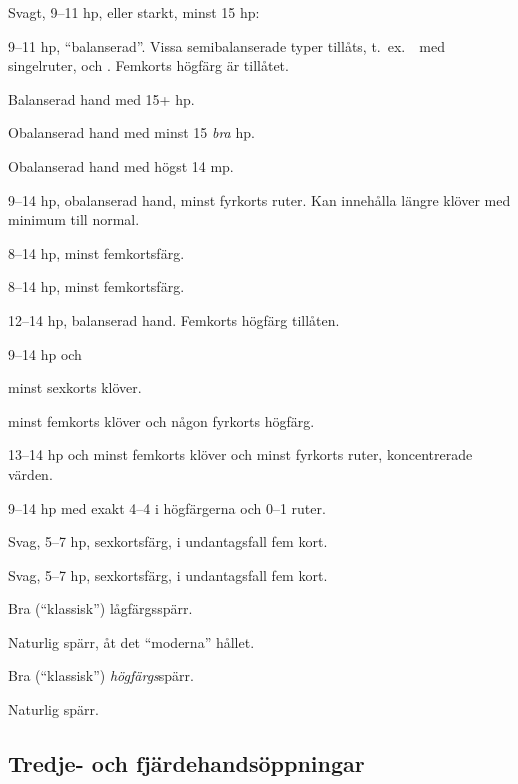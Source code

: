 \bbe
   \item[\kl{1}] Svagt, 9--11 hp, eller starkt, minst 15 hp: 
     \bnu
       \item 9--11 hp, ``balanserad''.  Vissa semibalanserade typer tillåts,
t.\ ex.\ \marmic\ med singelruter,  och .
Femkorts högfärg är tillåtet. 
       \item Balanserad hand med 15+ hp.
       \item Obalanserad hand med minst 15 \emph{bra} hp.
       \item Obalanserad hand med högst 14 mp.
     \enu

   \item[\ru{1}] 9--14 hp, obalanserad hand, minst fyrkorts ruter. Kan
               inneh{\aa}lla l\"angre kl\"over med minimum till normal.
   \item[\hj{1}] 8--14 hp, minst femkortsf\"arg.
   \item[\spa{1}] 8--14 hp, minst femkortsf\"arg.
   \item[\NT{1}] 12--14 hp, balanserad hand. Femkorts högfärg tillåten.

   \item[\kl{2}] 9--14 hp och
    \bnu
       \item minst sexkorts kl\"over.
       \item minst femkorts kl\"over och n{\aa}gon fyrkorts h\"ogf\"arg.
       \item 13--14 hp och minst femkorts kl\"over och minst fyrkorts
         ruter, koncentrerade värden.
    \enu

   \item[\ru{2}] 9--14 hp med exakt 4--4 i högfärgerna och 0--1 ruter.

   \item[\hj{2}] Svag, 5--7 hp, sexkortsfärg, i undantagsfall fem kort. 

   \item[\spa{2}] Svag, 5--7 hp, sexkortsfärg, i undantagsfall fem kort. 
   \item[\NT{2}] Bra (``klassisk'') lågfärgsspärr.
   \item[\la{3}\ho{3}] Naturlig spärr, åt det ``moderna'' hållet.
   \item[\NT{3}] Bra (``klassisk'') \emph{högfärgs}spärr.
   \item[\la{4}\ho{4}] Naturlig spärr. 
\ebe

\subsection{Tredje- och fj{\"a}rdehands{\"o}ppningar}

